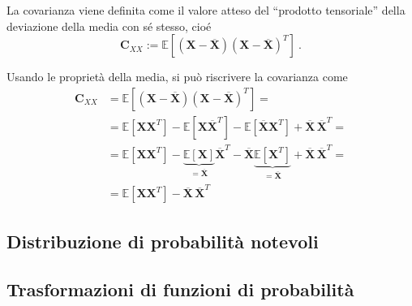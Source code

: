 \begin{definition}[Covarianza]
La covarianza viene definita come il valore atteso del ``prodotto tensoriale'' della deviazione della media con sé stesso, cioé
\begin{equation}
    \mathbf{C}_{XX} := \mathbb{E}[(\mathbf{X} - \overline{\mathbf{X}})(\mathbf{X} - \overline{\mathbf{X}})^T] \  .
\end{equation}
\end{definition}
%
\begin{example}
\end{example}
%
Usando le proprietà della media, si può riscrivere la covarianza come
\begin{equation}
\begin{aligned}
    \mathbf{C}_{XX} & = \mathbb{E}[(\mathbf{X} - \overline{\mathbf{X}})(\mathbf{X} - \overline{\mathbf{X}})^T] = \\
    & = \mathbb{E}[\mathbf{X} \mathbf{X}^T] - \mathbb{E}[\mathbf{X}\overline{\mathbf{X}}^T] - \mathbb{E}[\overline{\mathbf{X}}\mathbf{X}^T] + \overline{\mathbf{X}} \, \overline{\mathbf{X}}^T = \\
    & = \mathbb{E}[\mathbf{X} \mathbf{X}^T] - \underbrace{\mathbb{E}[\mathbf{X}]}_{= \overline{\mathbf{X}}}\overline{\mathbf{X}}^T - \overline{\mathbf{X}}\underbrace{\mathbb{E}[\mathbf{X}^T]}_{= \overline{\mathbf{X}}} + \overline{\mathbf{X}} \, \overline{\mathbf{X}}^T = \\
    & = \mathbb{E}[\mathbf{X} \mathbf{X}^T] - \overline{\mathbf{X}} \, \overline{\mathbf{X}}^T 
\end{aligned}
\end{equation}

\subsection{Distribuzione di probabilità notevoli}
\subsection{Trasformazioni di funzioni di probabilità}


